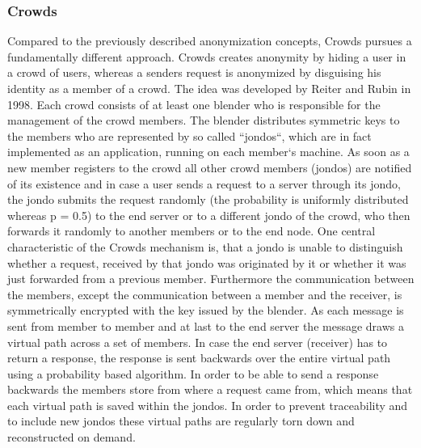 \documentclass{sig-alternate}
\begin{document}
\subsubsection {Crowds}
Compared to the previously described anonymization concepts, Crowds pursues a fundamentally different approach. Crowds creates anonymity by hiding a user in a crowd of users, whereas a senders request is anonymized by disguising his identity as a member of a crowd. The idea was developed by Reiter and Rubin\cite{reiter1998crowds} in 1998. Each crowd consists of at least one blender who is responsible for the management of the crowd members. The blender distributes symmetric keys to the members who are represented by so called ``jondos``, which are in fact implemented as an application, running on each member`s machine. As soon as a new member registers to the crowd all other crowd members (jondos) are notified of its existence and in case a user sends a request to a server through its jondo, the jondo submits the request randomly (the probability is uniformly distributed whereas p = 0.5) to the end server or to a different jondo of the crowd, who then forwards it randomly to another members or to the end node. One central characteristic of the Crowds mechanism is, that a jondo is unable to distinguish whether a request, received by that jondo was originated by it or whether it was just forwarded from a previous member. Furthermore the communication between the members, except the communication between a member and the receiver, is symmetrically encrypted with the key issued by the blender. As each message is sent from member to member and at last to the end server the message draws a virtual path across a set of members. In case the end server (receiver) has to return a response, the response is sent backwards over the entire virtual path using a probability based algorithm. In order to be able to send a response backwards the members store from where a request came from, which means that each virtual path is saved within the jondos. In order to prevent traceability and to include new jondos these virtual paths are regularly torn down and reconstructed on demand. 
\end{document}
